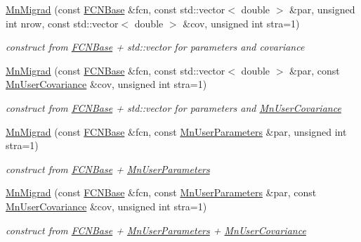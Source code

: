 \begin{DoxyCompactItemize}
\mbox{\hyperlink{classROOT_1_1Minuit2_1_1MnMigrad_a72c6740b17d24c92d0a0049d52de778e}{Mn\+Migrad}} (const \mbox{\hyperlink{classROOT_1_1Minuit2_1_1FCNBase}{F\+C\+N\+Base}} \&fcn, const std\+::vector$<$ double $>$ \&par, unsigned int nrow, const std\+::vector$<$ double $>$ \&cov, unsigned int stra=1)
\begin{DoxyCompactList}\small\item\em construct from \mbox{\hyperlink{classROOT_1_1Minuit2_1_1FCNBase}{F\+C\+N\+Base}} + std\+::vector for parameters and covariance \end{DoxyCompactList}\item 
\mbox{\hyperlink{classROOT_1_1Minuit2_1_1MnMigrad_a7830eb76c9d314bc8e101ac34150ccb8}{Mn\+Migrad}} (const \mbox{\hyperlink{classROOT_1_1Minuit2_1_1FCNBase}{F\+C\+N\+Base}} \&fcn, const std\+::vector$<$ double $>$ \&par, const \mbox{\hyperlink{classROOT_1_1Minuit2_1_1MnUserCovariance}{Mn\+User\+Covariance}} \&cov, unsigned int stra=1)
\begin{DoxyCompactList}\small\item\em construct from \mbox{\hyperlink{classROOT_1_1Minuit2_1_1FCNBase}{F\+C\+N\+Base}} + std\+::vector for parameters and \mbox{\hyperlink{classROOT_1_1Minuit2_1_1MnUserCovariance}{Mn\+User\+Covariance}} \end{DoxyCompactList}\item 
\mbox{\hyperlink{classROOT_1_1Minuit2_1_1MnMigrad_a552ce72a98922a75ef921a3cccfe97c1}{Mn\+Migrad}} (const \mbox{\hyperlink{classROOT_1_1Minuit2_1_1FCNBase}{F\+C\+N\+Base}} \&fcn, const \mbox{\hyperlink{classROOT_1_1Minuit2_1_1MnUserParameters}{Mn\+User\+Parameters}} \&par, unsigned int stra=1)
\begin{DoxyCompactList}\small\item\em construct from \mbox{\hyperlink{classROOT_1_1Minuit2_1_1FCNBase}{F\+C\+N\+Base}} + \mbox{\hyperlink{classROOT_1_1Minuit2_1_1MnUserParameters}{Mn\+User\+Parameters}} \end{DoxyCompactList}\item 
\mbox{\hyperlink{classROOT_1_1Minuit2_1_1MnMigrad_a02f279b4f09d995ed7c29abd203b9897}{Mn\+Migrad}} (const \mbox{\hyperlink{classROOT_1_1Minuit2_1_1FCNBase}{F\+C\+N\+Base}} \&fcn, const \mbox{\hyperlink{classROOT_1_1Minuit2_1_1MnUserParameters}{Mn\+User\+Parameters}} \&par, const \mbox{\hyperlink{classROOT_1_1Minuit2_1_1MnUserCovariance}{Mn\+User\+Covariance}} \&cov, unsigned int stra=1)
\begin{DoxyCompactList}\small\item\em construct from \mbox{\hyperlink{classROOT_1_1Minuit2_1_1FCNBase}{F\+C\+N\+Base}} + \mbox{\hyperlink{classROOT_1_1Minuit2_1_1MnUserParameters}{Mn\+User\+Parameters}} + \mbox{\hyperlink{classROOT_1_1Minuit2_1_1MnUserCovariance}{Mn\+User\+Covariance}} \end{DoxyCompactList}\item 

\end{DoxyCompactItemize}
